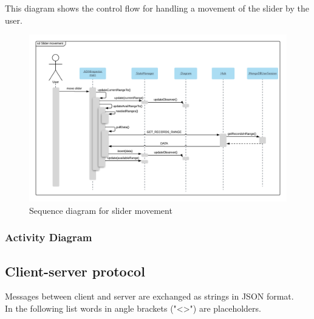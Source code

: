 \documentclass[oneside, english, final]{design}
\begin{document}
\newpage
This diagram shows the control flow for handling a movement of the slider by the user.\\
\begin{center}
\begin{figure}
\includegraphics[width=\textwidth]{images/sd_frontend_comm-slider_movement.png}
\caption{Sequence diagram for slider movement}
\label{fig:sd_slider_movement}
\end{figure}
\end{center}


\subsubsection{Activity Diagram}
\newpage


\subsection{Client-server protocol}

Messages between client and server are exchanged as strings in JSON format.
\\
In the following list words in angle brackets ("<>") are placeholders.
\\
\end{document}
